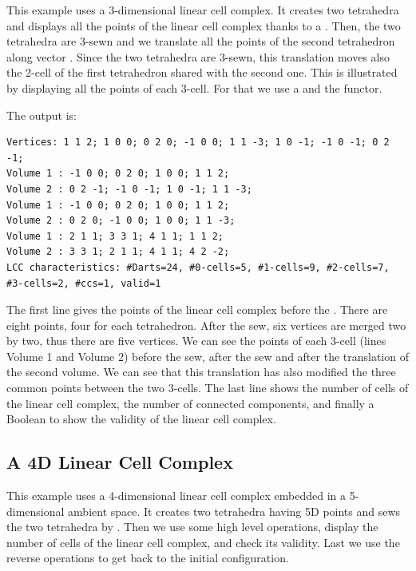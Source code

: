 This example uses a 3-dimensional linear cell complex. It creates two
tetrahedra and displays all the points of the linear cell complex
thanks to a . Then, the two
tetrahedra are 3-sewn and we translate all the points of the second
tetrahedron along vector .  Since the two tetrahedra
are 3-sewn, this translation moves also the 2-cell of the first
tetrahedron shared with the second one.  This is illustrated by
displaying all the points of each 3-cell. For that we use a
 and the  functor.


The output is:
\begin{verbatim}
Vertices: 1 1 2; 1 0 0; 0 2 0; -1 0 0; 1 1 -3; 1 0 -1; -1 0 -1; 0 2 -1; 
Volume 1 : -1 0 0; 0 2 0; 1 0 0; 1 1 2; 
Volume 2 : 0 2 -1; -1 0 -1; 1 0 -1; 1 1 -3; 
Volume 1 : -1 0 0; 0 2 0; 1 0 0; 1 1 2; 
Volume 2 : 0 2 0; -1 0 0; 1 0 0; 1 1 -3; 
Volume 1 : 2 1 1; 3 3 1; 4 1 1; 1 1 2; 
Volume 2 : 3 3 1; 2 1 1; 4 1 1; 4 2 -2; 
LCC characteristics: #Darts=24, #0-cells=5, #1-cells=9, #2-cells=7, #3-cells=2, #ccs=1, valid=1
\end{verbatim}

The first line gives the points of the linear cell complex before the
. There are eight points, four for each tetrahedron.
After the sew, six vertices are merged two by two, thus there are five
vertices. We can see the points of each 3-cell (lines Volume 1 and
Volume 2) before the sew, after the sew and after the translation of
the second volume.  We can see that this translation has also modified
the three common points between the two 3-cells.  The last line shows
the number of cells of the linear cell complex, the number of
connected components, and finally a Boolean to show the validity of
the linear cell complex.

\subsection{A 4D Linear Cell Complex}\label{ssec-5dexample}

This example uses a 4-dimensional linear cell complex embedded in a
5-dimensional ambient space.  It creates two tetrahedra having 5D
points and sews the two tetrahedra by \betaquatre{}. Then we use some high
level operations, display the number of cells of the linear cell
complex, and check its validity.  Last we use the reverse operations
to get back to the initial configuration.

